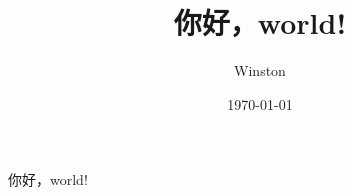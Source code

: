 \documentclass[UTF8]{ctexart}
\title{你好，world!}
\author{Winston}
\date{\today}
\begin{document}
\maketitle
你好，world!
\end{document}
